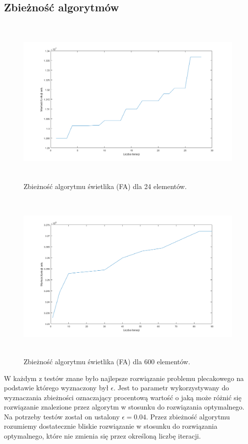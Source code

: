 \documentclass[11pt,a4paper,twoside]{article}
\begin{document}
\subsection{Zbieżność algorytmów}
\begin{figure}[ht]
\centering
\includegraphics[height=8.4cm, width=15.7cm]{zbieznoscFA24}
\caption{Zbieżność algorytmu świetlika (FA) dla 24 elementów.}
\label{zbieznoscFA24}
\end{figure}

\begin{figure}[ht]
\centering
\includegraphics[height=8.4cm, width=15.7cm]{zbieznoscFA600}
\caption{Zbieżność algorytmu świetlika (FA) dla 600 elementów.}
\label{zbieznoscFA600}
\end{figure}

W każdym z testów znane było najlepsze rozwiązanie  problemu plecakowego na podstawie którego wyznaczony był $\epsilon$. Jest to parametr wykorzystywany do wyznaczania zbieżności oznaczający procentową wartość o jaką może różnić się rozwiązanie znalezione przez algorytm w stosunku do rozwiązania optymalnego. Na potrzeby testów został on ustalony $\epsilon = 0.04$. Przez zbieżność algorytmu rozumiemy dostatecznie bliskie rozwiązanie w stosunku do rozwiązania optymalnego, które nie zmienia się przez określoną liczbę iteracji.
\end{document}
